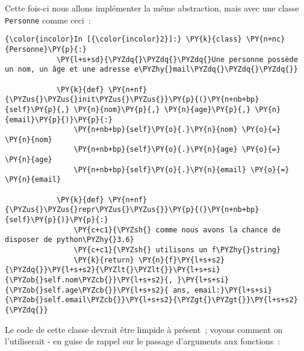     Cette fois-ci nous allons implémenter la même abstraction, mais avec une
classe \texttt{Personne} comme ceci~:

    \begin{Verbatim}[commandchars=\\\{\}]
{\color{incolor}In [{\color{incolor}2}]:} \PY{k}{class} \PY{n+nc}{Personne}\PY{p}{:}
            \PY{l+s+sd}{\PYZdq{}\PYZdq{}\PYZdq{}Une personne possède un nom, un âge et une adresse e\PYZhy{}mail\PYZdq{}\PYZdq{}\PYZdq{}}
            
            \PY{k}{def} \PY{n+nf}{\PYZus{}\PYZus{}init\PYZus{}\PYZus{}}\PY{p}{(}\PY{n+nb+bp}{self}\PY{p}{,} \PY{n}{nom}\PY{p}{,} \PY{n}{age}\PY{p}{,} \PY{n}{email}\PY{p}{)}\PY{p}{:}
                \PY{n+nb+bp}{self}\PY{o}{.}\PY{n}{nom} \PY{o}{=} \PY{n}{nom}
                \PY{n+nb+bp}{self}\PY{o}{.}\PY{n}{age} \PY{o}{=} \PY{n}{age}
                \PY{n+nb+bp}{self}\PY{o}{.}\PY{n}{email} \PY{o}{=} \PY{n}{email}
                
            \PY{k}{def} \PY{n+nf}{\PYZus{}\PYZus{}repr\PYZus{}\PYZus{}}\PY{p}{(}\PY{n+nb+bp}{self}\PY{p}{)}\PY{p}{:}
                \PY{c+c1}{\PYZsh{} comme nous avons la chance de disposer de python\PYZhy{}3.6}
                \PY{c+c1}{\PYZsh{} utilisons un f\PYZhy{}string}
                \PY{k}{return} \PY{n}{f}\PY{l+s+s2}{\PYZdq{}}\PY{l+s+s2}{\PYZlt{}\PYZlt{}}\PY{l+s+si}{\PYZob{}self.nom\PYZcb{}}\PY{l+s+s2}{, }\PY{l+s+si}{\PYZob{}self.age\PYZcb{}}\PY{l+s+s2}{ ans, email:}\PY{l+s+si}{\PYZob{}self.email\PYZcb{}}\PY{l+s+s2}{\PYZgt{}\PYZgt{}}\PY{l+s+s2}{\PYZdq{}}
\end{Verbatim}


    Le code de cette classe devrait être limpide à présent~; voyons comment
on l'utiliserait - en guise de rappel sur le passage d'arguments aux
fonctions~:

